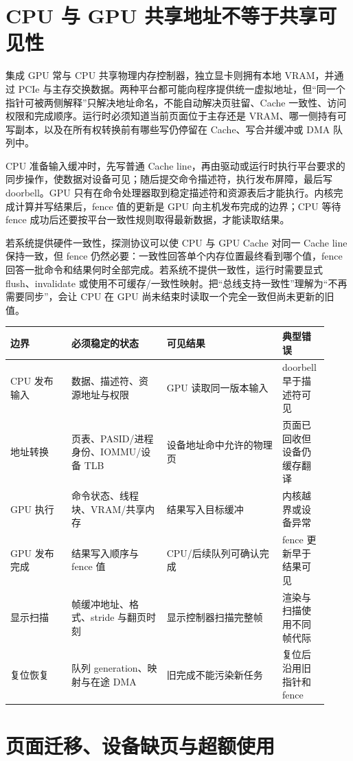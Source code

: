 \section{CPU 与 GPU 共享地址不等于共享可见性}

集成 GPU 常与 CPU 共享物理内存控制器，独立显卡则拥有本地 VRAM，并通过 PCIe 与主存交换数据。两种平台都可能向程序提供统一虚拟地址，但“同一个指针可被两侧解释”只解决地址命名，不能自动解决页驻留、Cache 一致性、访问权限和完成顺序。运行时必须知道当前页面位于主存还是 VRAM、哪一侧持有可写副本，以及在所有权转换前有哪些写仍停留在 Cache、写合并缓冲或 DMA 队列中。

CPU 准备输入缓冲时，先写普通 Cache line，再由驱动或运行时执行平台要求的同步操作，使数据对设备可见；随后提交命令描述符，执行发布屏障，最后写 doorbell。GPU 只有在命令处理器取到稳定描述符和资源表后才能执行。内核完成计算并写结果后，fence 值的更新是 GPU 向主机发布完成的边界；CPU 等待 fence 成功后还要按平台一致性规则取得最新数据，才能读取结果。

若系统提供硬件一致性，探测协议可以使 CPU 与 GPU Cache 对同一 Cache line 保持一致，但 fence 仍然必要：一致性回答单个内存位置最终看到哪个值，fence 回答一批命令和结果何时全部完成。若系统不提供一致性，运行时需要显式 flush、invalidate 或使用不可缓存/一致性映射。把“总线支持一致性”理解为“不再需要同步”，会让 CPU 在 GPU 尚未结束时读取一个完全一致但尚未更新的旧值。

\begin{longtable}{L{0.18\linewidth}L{0.28\linewidth}L{0.34\linewidth}L{0.12\linewidth}}
\toprule
边界 & 必须稳定的状态 & 可见结果 & 典型错误 \\
\midrule
CPU 发布输入 & 数据、描述符、资源地址与权限 & GPU 读取同一版本输入 & doorbell 早于描述符可见 \\
地址转换 & 页表、PASID/进程身份、IOMMU/设备 TLB & 设备地址命中允许的物理页 & 页面已回收但设备仍缓存翻译 \\
GPU 执行 & 命令状态、线程块、VRAM/共享内存 & 结果写入目标缓冲 & 内核越界或设备异常 \\
GPU 发布完成 & 结果写入顺序与 fence 值 & CPU/后续队列可确认完成 & fence 更新早于结果可见 \\
显示扫描 & 帧缓冲地址、格式、stride 与翻页时刻 & 显示控制器扫描完整帧 & 渲染与扫描使用不同帧代际 \\
复位恢复 & 队列 generation、映射与在途 DMA & 旧完成不能污染新任务 & 复位后沿用旧指针和 fence \\
\bottomrule
\end{longtable}

\section{页面迁移、设备缺页与超额使用}

